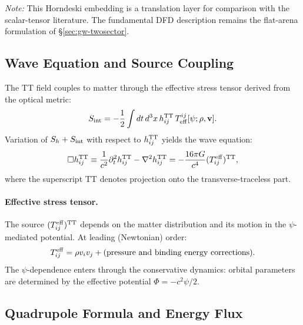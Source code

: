 \textit{Note:} This Horndeski embedding is a translation layer for comparison with the scalar-tensor literature. The fundamental DFD description remains the flat-arena formulation of \S\ref{sec:gw-twosector}.

\subsection{Wave Equation and Source Coupling}\label{sec:gw-wave-eq}

The TT field couples to matter through the effective stress tensor derived from the optical metric:
\begin{equation}\label{eq:gw-coupling}
S_{\rm int} = -\frac{1}{2}\int dt\, d^3x\, h_{ij}^{\rm TT}\, T^{ij}_{\rm eff}[\psi; \rho, \mathbf{v}].
\end{equation}
Variation of $S_h + S_{\rm int}$ with respect to $h_{ij}^{\rm TT}$ yields the wave equation:
\begin{equation}\label{eq:gw-wave}
\Box h_{ij}^{\rm TT} \equiv \frac{1}{c^2}\partial_t^2 h_{ij}^{\rm TT} - \nabla^2 h_{ij}^{\rm TT} = -\frac{16\pi G}{c^4}(T_{ij}^{\rm eff})^{\rm TT},
\end{equation}
where the superscript TT denotes projection onto the transverse-traceless part.

\paragraph{Effective stress tensor.}
The source $(T_{ij}^{\rm eff})^{\rm TT}$ depends on the matter distribution and its motion in the $\psi$-mediated potential. At leading (Newtonian) order:
\begin{equation}
T_{ij}^{\rm eff} = \rho v_i v_j + \text{(pressure and binding energy corrections)}.
\end{equation}
The $\psi$-dependence enters through the conservative dynamics: orbital parameters are determined by the effective potential $\Phi = -c^2\psi/2$.

\subsection{Quadrupole Formula and Energy Flux}\label{sec:gw-quadrupole}

